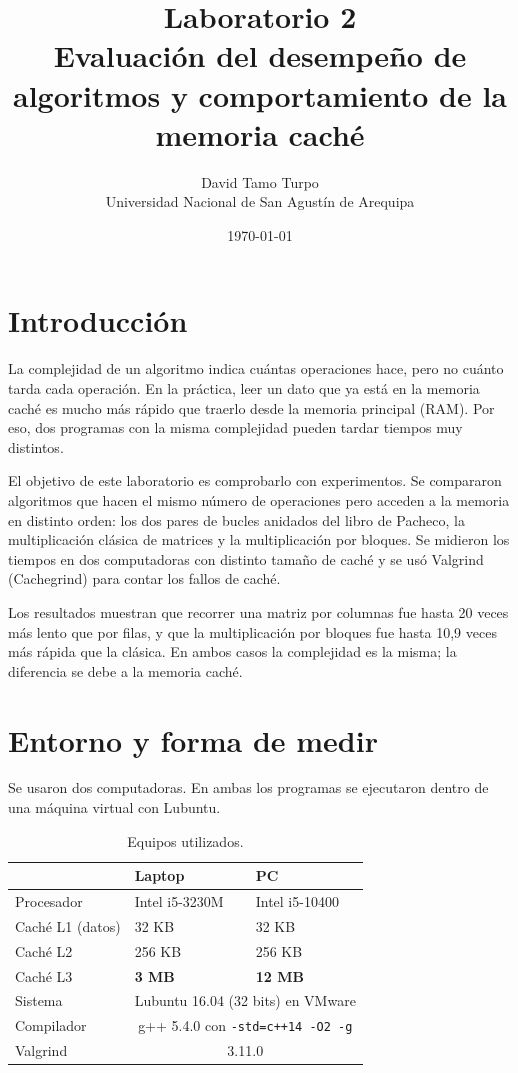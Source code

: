 \documentclass[11pt]{article}
\title{Laboratorio 2\\
Evaluación del desempeño de algoritmos y comportamiento de la memoria caché}
\author{David Tamo Turpo\\Universidad Nacional de San Agustín de Arequipa}
\date{\today}
\begin{document}
\maketitle

\section{Introducción}

La complejidad de un algoritmo indica cuántas operaciones hace, pero no
cuánto tarda cada operación. En la práctica, leer un dato que ya está en la
memoria caché es mucho más rápido que traerlo desde la memoria principal
(RAM). Por eso, dos programas con la misma complejidad pueden tardar tiempos
muy distintos.

El objetivo de este laboratorio es comprobarlo con experimentos. Se
compararon algoritmos que hacen el mismo número de operaciones pero acceden a
la memoria en distinto orden: los dos pares de bucles anidados del libro de
Pacheco, la multiplicación clásica de matrices y la multiplicación por
bloques. Se midieron los tiempos en dos computadoras con distinto tamaño de
caché y se usó Valgrind (Cachegrind) para contar los fallos de caché.

Los resultados muestran que recorrer una matriz por columnas fue hasta 20
veces más lento que por filas, y que la multiplicación por bloques fue hasta
10,9 veces más rápida que la clásica. En ambos casos la complejidad es la
misma; la diferencia se debe a la memoria caché.

\section{Entorno y forma de medir}

Se usaron dos computadoras. En ambas los programas se ejecutaron dentro de
una máquina virtual con Lubuntu.

\begin{table}[H]
\centering
\caption{Equipos utilizados.}
\begin{tabular}{lll}
\toprule
 & \textbf{Laptop} & \textbf{PC} \\
\midrule
Procesador & Intel i5-3230M & Intel i5-10400 \\
Caché L1 (datos) & 32 KB & 32 KB \\
Caché L2 & 256 KB & 256 KB \\
Caché L3 & \textbf{3 MB} & \textbf{12 MB} \\
Sistema & \multicolumn{2}{c}{Lubuntu 16.04 (32 bits) en VMware} \\
Compilador & \multicolumn{2}{c}{g++ 5.4.0 con \texttt{-std=c++14 -O2 -g}} \\
Valgrind & \multicolumn{2}{c}{3.11.0} \\
\bottomrule
\end{tabular}
\end{table}
\end{document}
